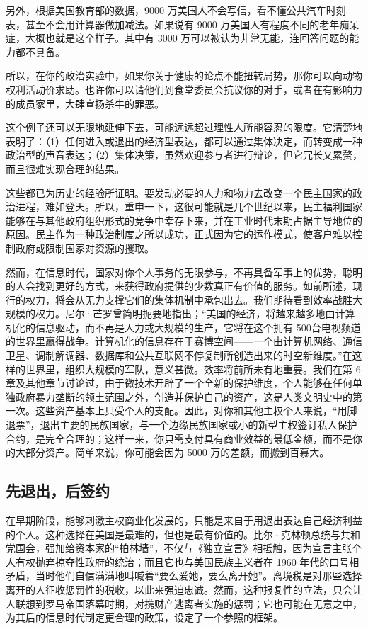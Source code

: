 另外，根据美国教育部的数据，9000 万美国人不会写信，看不懂公共汽车时刻表，甚至不会用计算器做加减法。如果说有 9000 万美国人有程度不同的老年痴呆症，大概也就是这个样子。其中有 3000 万可以被认为非常无能，连回答问题的能力都不具备。

所以，在你的政治实验中，如果你关于健康的论点不能扭转局势，那你可以向动物权利活动价求助。也许你可以请他们到食堂委员会抗议你的对手，或者在有影响力的成员家里，大肆宣扬杀牛的罪恶。

这个例子还可以无限地延伸下去，可能远远超过理性人所能容忍的限度。它清楚地表明了：（1）任何进入或退出的经济型表达，都可以通过集体决定，而转变成一种政治型的声音表达；（2）集体决策，虽然欢迎参与者进行辩论，但它冗长又累赘，而且很难实现合理的结果。

这些都已为历史的经验所证明。要发动必要的人力和物力去改变一个民主国家的政治进程，难如登天。所以，重申一下，这很可能就是几个世纪以来，民主福利国家能够在与其他政府组织形式的竞争中幸存下来，并在工业时代末期占据主导地位的原因。民主作为一种政治制度之所以成功，正式因为它的运作模式，使客户难以控制政府或限制国家对资源的攫取。

然而，在信息时代，国家对你个人事务的无限参与，不再具备军事上的优势，聪明的人会找到更好的方式，来获得政府提供的少数真正有价值的服务。如前所述，现行的权力，将会从无力支撑它们的集体机制中承包出去。我们期待看到效率战胜大规模的权力。尼尔·芒罗曾简明扼要地指出；“美国的经济，将越来越多地由计算机化的信息驱动，而不再是人力或大规模的生产，它将在这个拥有 500台电视频道的世界里赢得战争。计算机化的信息存在于赛博空间——一个由计算机网络、通信卫星、调制解调器、数据库和公共互联网不停复制所创造出来的时空新维度。”在这样的世界里，组织大规模的军队，意义甚微。效率将前所未有地重要。我们在第 6 章及其他章节讨论过，由于微技术开辟了一个全新的保护维度，个人能够在任何单独政府暴力垄断的领土范围之外，创造并保护自己的资产，这是人类文明史中的第一次。这些资产基本上只受个人的支配。因此，对你和其他主权个人来说，“用脚退票”，退出主要的民族国家，与一个边缘民族国家或小的新型主权签订私人保护合约，是完全合理的；这样一来，你只需支付具有商业效益的最低金额，而不是你的大部分资产。简单来说，你可能会因为 5000 万的差额，而搬到百慕大。

\subsection{先退出，后签约}
在早期阶段，能够刺激主权商业化发展的，只能是来自于用退出表达自己经济利益的个人。这种选择在美国是最难的，但也是最有价值的。比尔·克林顿总统与共和党国会，强加给资本家的“柏林墙”，不仅与《独立宣言》相抵触，因为宣言主张个人有权抛弃掠夺性政府的统治；而且它也与美国民族主义者在 1960 年代的口号相矛盾，当时他们自信满满地叫喊着“要么爱她，要么离开她”。离境税是对那些选择离开的人征收惩罚性的税收，以此来强迫忠诚。然而，这种报复性的立法，只会让人联想到罗马帝国落幕时期，对携财产逃离者实施的惩罚；它也可能在无意之中，为其后的信息时代制定更合理的政策，设定了一个参照的框架。

